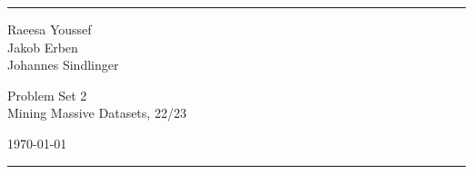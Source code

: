\documentclass[a4paper]{article}
\begin{document}

\fancyhead[C]{}
\hrule \medskip %
\begin{minipage}{0.295\textwidth} 
\raggedright
\footnotesize
Raeesa Youssef \hfill\\   
Jakob Erben\hfill\\
Johannes Sindlinger
\end{minipage}
\begin{minipage}{0.4\textwidth} 
\centering 
\large 
Problem Set 2\\ 
\normalsize 
Mining Massive Datasets, 22/23\\ 
\end{minipage}
\begin{minipage}{0.295\textwidth} 
\raggedleft
\today\hfill\\
\end{minipage}
\medskip\hrule 
\bigskip




\end{document}
